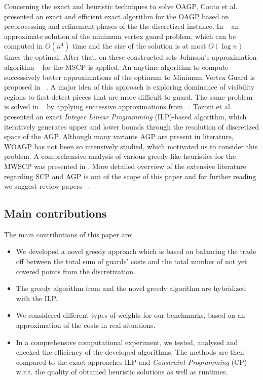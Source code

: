 \documentclass[runningheads,a4paper]{elsarticle}
\begin{document}
	Concerning the exact and heuristic techniques to solve OAGP, Couto et al.~\cite{couto2007exact} presented an exact and efficient exact algorithm for the OAGP based on preprocessing and refinement phases of the the discretized instance. In ~\cite{ghosh2010approximation} an approximate solution of the minimum vertex guard problem, which can be computed in $O(n^4)$ time and the size of the solution is at most $O(\log n)$ times the optimal. After that, on these constructed sets Johnson’s approximation algorithm ~\cite{johnson1974approximation} for the MSCP is applied. An anytime algorithm to compute successively better approximations of the optimum to Minimum Vertex Guard is proposed in ~\cite{tomas2003approximation}.  A major idea of this approach is exploring dominance of visibility regions to first detect pieces that are
	more difficult to guard. The same problem is solved   in ~\cite{tomas2006visibility} by applying successive approximations from  ~\cite{tomas2003approximation}.
	Tozoni et al. ~\cite{tozoni2013practical,tozoni2016algorithm}  presented an exact \emph{Integer Linear Programming}  (ILP)-based  algorithm, which iteratively generates upper and lower bounds through the resolution of discretized space of the AGP. Although many variants AGP are present in literature, WOAGP has not been so intensively studied, which motivated us to consider this problem.
	A comprehensive analysis of various greedy-like heuristics for the MWSCP  was presented in \cite{vasko2016best}.
	More detailed overview of the extensive literature regarding SCP and AGP is out of the scope of this paper and for further reading we suggest review papers ~\cite{caprara2000algorithms,ren2010new,ghosh2010approximation2}.

	
	\subsection{Main contributions}
	The main contributions of this paper are:
	\begin{itemize}
		\item We developed a novel greedy approach which is based on balancing the trade off between the total sum of guards' costs and the total number of not yet covered points from the discretization.
	
		\item The  greedy algorithm from \cite{chvatal1979greedy} and the novel greedy algorithm are hybridized with the ILP.
		\item We considered different types of weights for our benchmarks, based on an approximation of the costs in real situations.
		\item In a comprehensive computational experiment,  we tested, analysed and checked the efficiency of the developed algorithms. The methods are then compared to the exact approaches ILP and \emph{Constraint Programming} (CP) w.r.t. the quality of obtained heuristic solutions as well as runtimes.
	\end{itemize}
\end{document}
